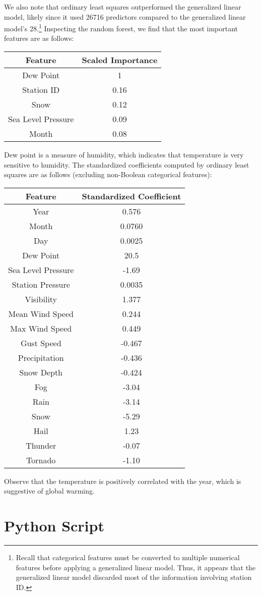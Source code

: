 \documentclass[letterpaper]{article}
\begin{document}
We also note that ordinary least squares outperformed the
generalized linear model, likely since it used 26716 predictors
compared to the generalized linear model's 28.\footnote{Recall that
  categorical features must be converted to multiple numerical
  features before applying a generalized linear model. Thus, it
  appears that the generalized linear model discarded most of the
  information involving station ID.} Inspecting the random forest, we
find that the most important features are as follows:
\begin{table}[H]
  \centering
  \begin{tabular}{c|c}
    Feature & Scaled Importance \\ \hline
    Dew Point & 1 \\
    Station ID & 0.16 \\
    Snow & 0.12 \\
    Sea Level Pressure & 0.09 \\
    Month & 0.08
  \end{tabular}
\end{table}
\noindent
Dew point is a measure of humidity, which indicates that temperature
is very sensitive to humidity.  The standardized coefficients computed
by ordinary least squares are as follows (excluding non-Boolean
categorical features):
\begin{table}[H]
  \centering
  \begin{tabular}{c|c}
    Feature & Standardized Coefficient \\ \hline
    Year & 0.576 \\
    Month & 0.0760 \\
    Day & 0.0025 \\
    Dew Point & 20.5 \\
    Sea Level Pressure & -1.69 \\
    Station Pressure & 0.0035 \\
    Visibility & 1.377 \\
    Mean Wind Speed & 0.244  \\
    Max Wind Speed & 0.449 \\
    Gust Speed & -0.467 \\
    Precipitation & -0.436 \\
    Snow Depth & -0.424 \\
    Fog & -3.04 \\
    Rain & -3.14 \\
    Snow & -5.29 \\
    Hail & 1.23 \\
    Thunder & -0.07 \\
    Tornado & -1.10
  \end{tabular}
\end{table}
\noindent Observe that the temperature is positively correlated with
the year, which is suggestive of global warming.

\appendices
\section{Python Script} \label{appendix:python}

\end{document}
